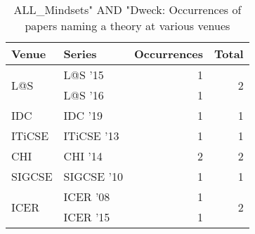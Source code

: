 \begin{table*}[t]
\begin{tabular}{llrr}
Venue & Series & Occurrences & Total\\\hline
\multirow{2}{*}{L@S } & L@S '15 & 1 & \multirow{2}{*}{2}\\
& L@S '16 & 1 &\\
\multirow{1}{*}{IDC } & IDC '19 & 1 & \multirow{1}{*}{1}\\
\multirow{1}{*}{ITiCSE } & ITiCSE '13 & 1 & \multirow{1}{*}{1}\\
\multirow{1}{*}{CHI } & CHI '14 & 2 & \multirow{1}{*}{2}\\
\multirow{1}{*}{SIGCSE } & SIGCSE '10 & 1 & \multirow{1}{*}{1}\\
\multirow{2}{*}{ICER } & ICER '08 & 1 & \multirow{2}{*}{2}\\
& ICER '15 & 1 &\\
\end{tabular}
\caption{ALL\_Mindsets" AND "Dweck: Occurrences of papers naming a theory at various venues}
\end{table*}